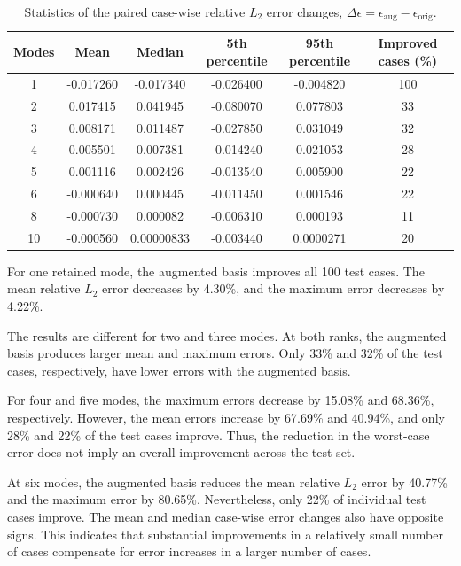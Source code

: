 \begin{table}[htbp]
    \centering
    \caption{Statistics of the paired case-wise relative
    $L_2$ error changes,
    $\Delta\epsilon=\epsilon_{\mathrm{aug}}-\epsilon_{\mathrm{orig}}$.}
    \label{tab:casewise_error_changes}
    \small
    \begin{tabular}{cccccc}
        \toprule
        \textbf{Modes} &
        \textbf{Mean} &
        \textbf{Median} &
        \textbf{5th percentile} &
        \textbf{95th percentile} &
        \textbf{Improved cases (\%)} \\
        \midrule
        1  & -0.017260 & -0.017340 & -0.026400 & -0.004820 & 100 \\
        2  &  0.017415 &  0.041945 & -0.080070 &  0.077803 & 33 \\
        3  &  0.008171 &  0.011487 & -0.027850 &  0.031049 & 32 \\
        4  &  0.005501 &  0.007381 & -0.014240 &  0.021053 & 28 \\
        5  &  0.001116 &  0.002426 & -0.013540 &  0.005900 & 22 \\
        6  & -0.000640 &  0.000445 & -0.011450 &  0.001546 & 22 \\
        8  & -0.000730 &  0.000082 & -0.006310 &  0.000193 & 11 \\
        10 & -0.000560 &  0.00000833 & -0.003440 &  0.0000271 & 20 \\
        \bottomrule
    \end{tabular}
\end{table}

For one retained mode, the augmented basis improves all
100 test cases. The mean relative $L_2$ error decreases
by 4.30\%, and the maximum error decreases by 4.22\%.

The results are different for two and three modes. At
both ranks, the augmented basis produces larger mean
and maximum errors. Only 33\% and 32\% of the test
cases, respectively, have lower errors with the
augmented basis.

For four and five modes, the maximum errors decrease
by 15.08\% and 68.36\%, respectively. However, the
mean errors increase by 67.69\% and 40.94\%, and
only 28\% and 22\% of the test cases improve. Thus,
the reduction in the worst-case error does not imply
an overall improvement across the test set.

At six modes, the augmented basis reduces the mean
relative $L_2$ error by 40.77\% and the maximum error
by 80.65\%. Nevertheless, only 22\% of individual
test cases improve. The mean and median case-wise
error changes also have opposite signs. This indicates
that substantial improvements in a relatively small
number of cases compensate for error increases in
a larger number of cases.


